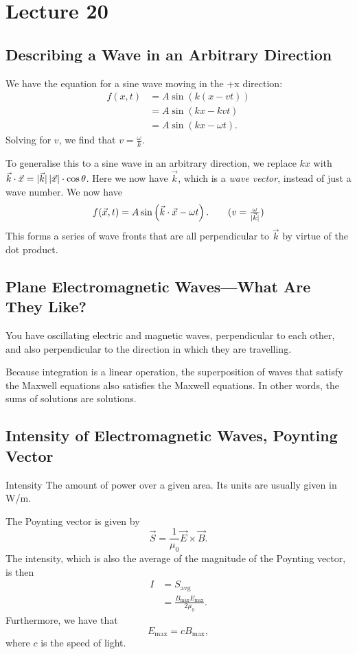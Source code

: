 \documentclass[class=article, crop=false]{standalone}
\begin{document}
  \section{Lecture 20}
  \subsection{Describing a Wave in an Arbitrary Direction}
  We have the equation for a sine wave moving in the +x direction:
  \begin{align*}
    f(x, t) &= A\sin(k(x - vt)) \\
            &= A\sin(kx - kvt) \\
            &= A\sin(kx - \omega t) \tag{$\omega\ceq kv$}.
  \end{align*}
  Solving for $v$, we find that $v = \frac{\omega}{k}$. \par
  To generalise this to a sine wave in an arbitrary direction, we replace $kx$ with $\vec{k}\cdot \vec{x} = \lvert\vec{k}\rvert\left\lvert \vec{x} \right\rvert\cdot \cos\theta$. Here we now have $\vec{k}$, which is a \emph{wave vector}, instead of just a wave number. We now have
  \[
    f(\vec{x},t) = A\sin\paren{\vec{k}\cdot \vec{x} - \omega t}. \tag{$v = \frac{\omega}{\lvert\vec{k}\rvert}$}
  \]
  This forms a series of wave fronts that are all perpendicular to $\vec{k}$ by virtue of the dot product.
  \subsection{Plane Electromagnetic Waves---What Are They Like?}
  You have oscillating electric and magnetic waves, perpendicular to each other, and also perpendicular to the direction in which they are travelling.
  \begin{note}{}
    Because integration is a linear operation, the superposition of waves that satisfy the Maxwell equations also satisfies the Maxwell equations. In other words, the sums of solutions are solutions.
  \end{note}
  \subsection{Intensity of Electromagnetic Waves, Poynting Vector}
  \begin{definition}{Intensity}
    The amount of power over a given area. Its units are usually given in W/m.
  \end{definition}
  The Poynting vector is given by
  \[
    \vec{S} = \frac{1}{\mu_0}\vec{E}\times \vec{B}.
  \]
  The intensity, which is also the average of the magnitude of the Poynting vector, is then
  \begin{align*}
    I &= S_\text{avg} \\
      &= \frac{B_\text{max}E_\text{max}}{2\mu_0}.
  \end{align*}
  Furthermore, we have that
  \[
    E_\text{max} = cB_\text{max},
  \]
  where $c$ is the speed of light.
\end{document}

